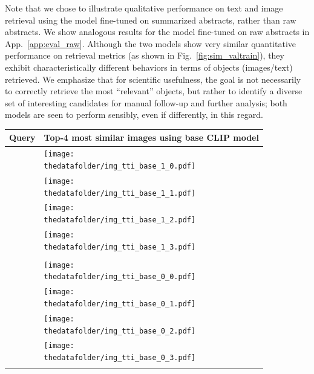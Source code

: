 \documentclass[10pt]{article} %
\begin{document}
Note that we chose to illustrate qualitative performance on text and image retrieval using the model fine-tuned on summarized abstracts, rather than raw abstracts. We show analogous results for the model fine-tuned on raw abstracts in App.~\ref{app:eval_raw}. Although the two models show very similar quantitative performance on retrieval metrics (as shown in Fig.~\ref{fig:sim_valtrain}), they exhibit characteristically different behaviors in terms of objects (images/text) retrieved. We emphasize that for scientific usefulness, the goal is not necessarily to correctly retrieve the most ``relevant'' objects, but rather to identify a diverse set of interesting candidates for manual follow-up and further analysis; both models are seen to perform sensibly, even if differently, in this regard.


\begin{table}[h!]
  \centering
  \begin{tabular}{m{2.7cm} p{2.9cm} p{2.9cm} p{2.9cm} p{2.9cm}}
      \toprule
      \centering \bfseries Query & \multicolumn{4}{c}{\bfseries{Top-4 most similar images using \textcolor{deeppurple}{base CLIP model}}} \tabularnewline
      \midrule
      \texttt{} \vspace{20mm} & \centering \texttt{[image: \\thedatafolder/img\_tti\_base\_1\_0.pdf]} \\  & \centering \texttt{[image: \\thedatafolder/img\_tti\_base\_1\_1.pdf]} \\  & \centering \texttt{[image: \\thedatafolder/img\_tti\_base\_1\_2.pdf]} \\  & \centering \texttt{[image: \\thedatafolder/img\_tti\_base\_1\_3.pdf]} \\   \tabularnewline
      \midrule
       \texttt{} \vspace{20mm} & \centering \texttt{[image: \\thedatafolder/img\_tti\_base\_0\_0.pdf]} \\  & \centering \texttt{[image: \\thedatafolder/img\_tti\_base\_0\_1.pdf]} \\  & \centering \texttt{[image: \\thedatafolder/img\_tti\_base\_0\_2.pdf]} \\  & \centering \texttt{[image: \\thedatafolder/img\_tti\_base\_0\_3.pdf]} \\   \tabularnewline

\end{tabular}
\end{table}
\end{document}
